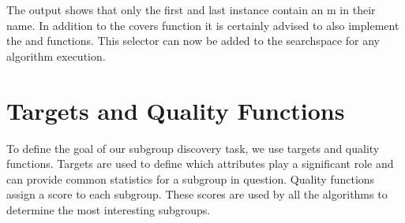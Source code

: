 \documentclass[letterpaper,10pt,english]{sphinxmanual}
\begin{document}
\begin{sphinxVerbatim}[commandchars=\\\{\}]
 
       
          
          

      
         \PYG{p}{[}\PYG{p}{]}

  
\end{sphinxVerbatim}

\begin{sphinxVerbatim}
\end{sphinxVerbatim}

The output shows that only the first and last instance contain an m in their name.
In addition to the covers function it is certainly advised to also implement the  and  functions. This selector can now be added to the searchspace for any algorithm execution.


\chapter{Targets and Quality Functions}
\label{\detokenize{targets:targets-and-quality-functions}}\label{\detokenize{targets::doc}}
To define the goal of our subgroup discovery task, we use targets and quality functions. Targets are used to define which attributes play a significant role and can provide common statistics for a subgroup in question. Quality functions assign a score to each subgroup.
These scores are used by all the algorithms to determine the most interesting subgroups.
\end{document}
